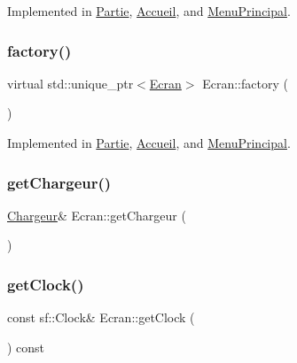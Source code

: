 Implemented in \mbox{\hyperlink{class_partie_a20962c87a84b89afc4bde92dcc74ac0d}{Partie}}, \mbox{\hyperlink{class_accueil_adfc33857bbaeedd9cac862b90bb79e4e}{Accueil}}, and \mbox{\hyperlink{class_menu_principal_aed108ac830821b93ae4a03673ec566b9}{Menu\+Principal}}.

\mbox{\label{class_ecran_a016213731438ce2fb37831d8b0eeabed}} 
\subsubsection{\texorpdfstring{factory()}{factory()}}
{\footnotesize\ttfamily virtual std\+::unique\+\_\+ptr$<$\mbox{\hyperlink{class_ecran}{Ecran}}$>$ Ecran\+::factory (\begin{DoxyParamCaption}{ }\end{DoxyParamCaption})\hspace{0.3cm}{\ttfamily [pure virtual]}}



Implemented in \mbox{\hyperlink{class_partie_ae0a8a91c00a070f0b324547a0075abc5}{Partie}}, \mbox{\hyperlink{class_accueil_a4448beee6ac1cc997afed55ebd4b9367}{Accueil}}, and \mbox{\hyperlink{class_menu_principal_aa00616cf1c159b871ecbea2807be2687}{Menu\+Principal}}.

\mbox{\label{class_ecran_a9b781eadd60c166948dc1ea2bc04194d}} 
\subsubsection{\texorpdfstring{get\+Chargeur()}{getChargeur()}}
{\footnotesize\ttfamily \mbox{\hyperlink{class_chargeur}{Chargeur}}\& Ecran\+::get\+Chargeur (\begin{DoxyParamCaption}{ }\end{DoxyParamCaption})\hspace{0.3cm}{\ttfamily [inline]}}

\mbox{\label{class_ecran_ae9a020b22b2c022a082fa3d7566af0e9}} 
\subsubsection{\texorpdfstring{get\+Clock()}{getClock()}}
{\footnotesize\ttfamily const sf\+::\+Clock\& Ecran\+::get\+Clock (\begin{DoxyParamCaption}{ }\end{DoxyParamCaption}) const\hspace{0.3cm}{\ttfamily [inline]}}

